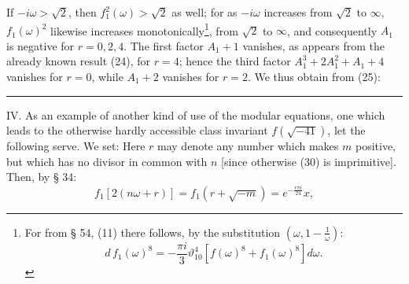 If $-i\omega > \sqrt2$, then $f_1^2(\omega) > \sqrt2$ as well; for as
$-i\omega$ increases from $\sqrt2$ to $\infty$, $f_1(\omega)^2$ likewise
increases monotonically\footnote{For from § 54, (11) there follows, by the substitution $(\omega, 1-\frac1{\omega})$:
\[ d\,f_1(\omega)^8 = -\frac{\pi i}{3}\vartheta_{10}^4\left[f(\omega)^8+f_1(\omega)^8\right]d\omega. \]},
from $\sqrt2$ to $\infty$, and consequently $A_1$ is negative for
$r = 0, 2, 4$.
The first factor $A_1+1$ vanishes, as appears from the already
known result (24), for $r = 4$; hence the third factor
$A_1^3+2A_1^2+A_1+4$ vanishes for $r = 0$, while
$A_1+2$ vanishes for $r = 2$.
We thus obtain from (25):

\begin{center}\rule{3cm}{0.4pt}\end{center}

IV. As an example of another kind of use of the
 modular equations, one which leads to the otherwise hardly
 accessible class invariant $f(\sqrt{-41})$, let the following
serve.
We set:
Here $r$ may denote any number which makes $m$ positive,
but which has no divisor in common with $n$ [since otherwise
(30) is imprimitive]. Then, by § 34:
\[ f_1[2(n\omega+r)] = f_1(r+\sqrt{-m}) = e^{-\frac{r\pi i}{24}}x, \]
